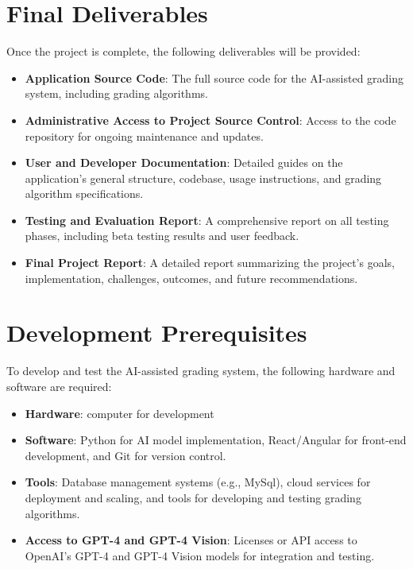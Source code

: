 \documentclass[ms,twoside,print]{nuthesis}
\begin{document}
\section{Final Deliverables}

Once the project is complete, the following deliverables will be provided:

\begin{itemize}
    \item \textbf{Application Source Code}: The full source code for the AI-assisted grading system, including grading algorithms.
    \item \textbf{Administrative Access to Project Source Control}: Access to the code repository for ongoing maintenance and updates.
    \item \textbf{User and Developer Documentation}: Detailed guides on the application's general structure, codebase, usage instructions, and grading algorithm specifications.
    \item \textbf{Testing and Evaluation Report}: A comprehensive report on all testing phases, including beta testing results and user feedback.
    \item \textbf{Final Project Report}: A detailed report summarizing the project's goals, implementation, challenges, outcomes, and future recommendations.
\end{itemize}

\section{Development Prerequisites}

To develop and test the AI-assisted grading system, the following hardware and software are required:

\begin{itemize}
    \item \textbf{Hardware}: computer for development
    \item \textbf{Software}: Python for AI model implementation, React/Angular for front-end development, and Git for version control.
    \item \textbf{Tools}: Database management systems (e.g., MySql), cloud services for deployment and scaling, and tools for developing and testing grading algorithms.
    \item \textbf{Access to GPT-4 and GPT-4 Vision}: Licenses or API access to OpenAI's GPT-4 and GPT-4 Vision models for integration and testing.
\end{itemize}
\end{document}

